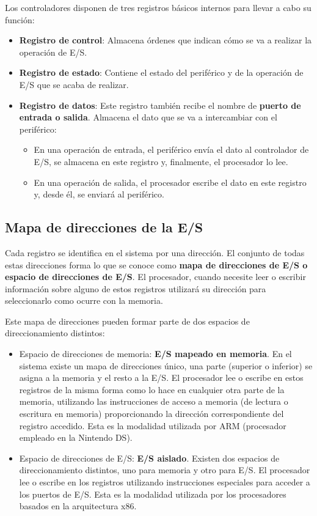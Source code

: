 Los controladores disponen de tres registros básicos internos para llevar a cabo su función: 

\begin{itemize}
	\item \textbf{Registro de control}: Almacena órdenes que indican cómo se va a realizar la operación de E/S. 
	\item \textbf{Registro de estado}: Contiene el estado del periférico y de la operación de E/S que se acaba de realizar.
	
	\item \textbf{Registro de datos}: Este registro también recibe el nombre de {\bf puerto de entrada o salida}. Almacena el dato que se va a intercambiar con el periférico:
	\begin{itemize}
		\item En una operación de entrada, el periférico envía el dato al controlador de E/S, se almacena en este registro y, finalmente, el procesador lo lee. 
		\item En una operación de  salida, el procesador escribe el dato  en este registro y, desde él, se enviará al periférico.
	\end{itemize}
\end{itemize}

\subsection{Mapa de direcciones de la E/S}
Cada registro se identifica en el sistema por una dirección. El conjunto de todas estas direcciones  forma lo que se conoce como {\bf mapa de direcciones de E/S o espacio de direcciones de E/S}. El procesador, cuando necesite leer o escribir información sobre alguno de estos registros utilizará su dirección para seleccionarlo como ocurre con la memoria.  

Este mapa de direcciones  pueden formar parte de dos espacios de direccionamiento distintos: 

\begin{itemize}
	\item Espacio de direcciones de memoria: {\bf E/S mapeado en memoria}. En el sistema existe un mapa de direcciones único, una parte (superior o inferior) se asigna a la memoria y el resto a la E/S. El procesador lee o escribe en estos registros de la misma forma  como lo hace  en cualquier otra parte de la memoria, utilizando las instrucciones de acceso 
	a memoria (de lectura o escritura en memoria)  proporcionando la dirección correspondiente del registro accedido. Esta es la modalidad utilizada por ARM (procesador empleado en la Nintendo DS).
	\item Espacio de  direcciones de E/S: {\bf E/S aislado}. Existen dos espacios de direccionamiento distintos, uno para memoria y otro para E/S. El procesador lee o escribe
	en los registros utilizando instrucciones especiales para acceder a los puertos de E/S. Esta es la modalidad utilizada por los procesadores basados en la arquitectura x86.
\end{itemize}

